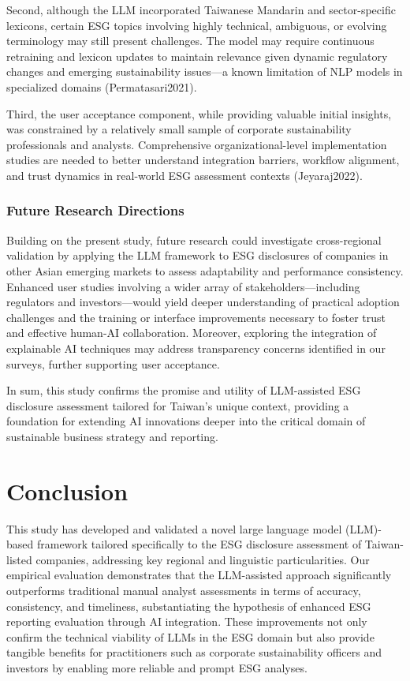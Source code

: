 \documentclass[
  12pt,
]{article}
\begin{document}
Second, although the LLM incorporated Taiwanese Mandarin and
sector-specific lexicons, certain ESG topics involving highly technical,
ambiguous, or evolving terminology may still present challenges. The
model may require continuous retraining and lexicon updates to maintain
relevance given dynamic regulatory changes and emerging sustainability
issues---a known limitation of NLP models in specialized domains
(Permatasari2021).

Third, the user acceptance component, while providing valuable initial
insights, was constrained by a relatively small sample of corporate
sustainability professionals and analysts. Comprehensive
organizational-level implementation studies are needed to better
understand integration barriers, workflow alignment, and trust dynamics
in real-world ESG assessment contexts (Jeyaraj2022).

\subsubsection{Future Research
Directions}\label{future-research-directions}

Building on the present study, future research could investigate
cross-regional validation by applying the LLM framework to ESG
disclosures of companies in other Asian emerging markets to assess
adaptability and performance consistency. Enhanced user studies
involving a wider array of stakeholders---including regulators and
investors---would yield deeper understanding of practical adoption
challenges and the training or interface improvements necessary to
foster trust and effective human-AI collaboration. Moreover, exploring
the integration of explainable AI techniques may address transparency
concerns identified in our surveys, further supporting user acceptance.

In sum, this study confirms the promise and utility of LLM-assisted ESG
disclosure assessment tailored for Taiwan's unique context, providing a
foundation for extending AI innovations deeper into the critical domain
of sustainable business strategy and reporting.

\section{Conclusion}\label{conclusion}

This study has developed and validated a novel large language model
(LLM)-based framework tailored specifically to the ESG disclosure
assessment of Taiwan-listed companies, addressing key regional and
linguistic particularities. Our empirical evaluation demonstrates that
the LLM-assisted approach significantly outperforms traditional manual
analyst assessments in terms of accuracy, consistency, and timeliness,
substantiating the hypothesis of enhanced ESG reporting evaluation
through AI integration. These improvements not only confirm the
technical viability of LLMs in the ESG domain but also provide tangible
benefits for practitioners such as corporate sustainability officers and
investors by enabling more reliable and prompt ESG analyses.
\end{document}
